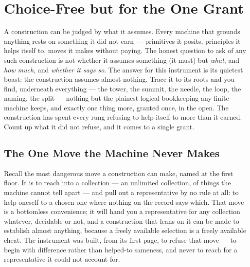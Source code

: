 \chapter{Choice-Free but for the One Grant}

A construction can be judged by what it assumes. Every machine that grounds anything rests on something it did not
earn --- primitives it posits, principles it helps itself to, moves it makes without paying. The honest question
to ask of any such construction is not whether it assumes something (it must) but \emph{what}, and \emph{how
much}, and \emph{whether it says so}. The answer for this instrument is its quietest boast: the construction
assumes almost nothing. Trace it to its roots and you find, underneath everything --- the tower, the summit, the
needle, the loop, the naming, the split --- nothing but the plainest logical bookkeeping any finite machine keeps,
and exactly one thing more, granted once, in the open. The construction has spent every rung refusing to help
itself to more than it earned. Count up what it did not refuse, and it comes to a single grant.

\section{The One Move the Machine Never Makes}

Recall the most dangerous move a construction can make, named at the first floor. It is to
reach into a collection --- an unlimited collection, of things the machine cannot tell apart --- and pull out a
representative by no rule at all: to help oneself to a chosen one where nothing on the record says which. That
move is a bottomless convenience; it will hand you a representative for any collection whatever, decidable or not,
and a construction that leans on it can be made to establish almost anything, because a freely available selection
is a freely available cheat. The instrument was built, from its first page, to refuse that move --- to begin with
difference rather than helped-to sameness, and never to reach for a representative it could not account for.

